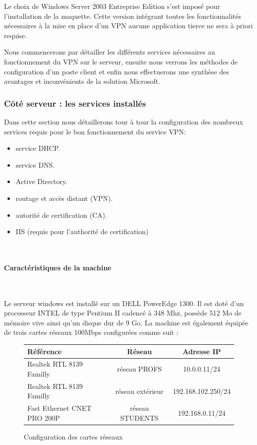 Le choix de Windows Server 2003 Entreprise Edition s'est imposé pour l'installation de la maquette. Cette version intégrant toutes les fonctionnalités nécessaires à la mise en place d'un VPN aucune application tierce ne sera à priori requise.

Nous commencerons par détailler les différents services nécessaires au fonctionnement du VPN sur le serveur, ensuite nous verrons les méthodes de configuration d'un poste client et enfin nous effectuerons une synthèse des avantages et inconvénients de la solution Microsoft.

\subsubsection{Côté serveur : les services installés}

Dans cette section nous détaillerons tour à tour la configuration des nombreux services requis pour le bon fonctionnement du service VPN:
\begin{itemize}
	\item service DHCP.
	\item service DNS.
	\item Active Directory.
	\item routage et accès distant (VPN).
	\item autorité de certification (CA).
	\item IIS (requis pour l'authorité de certification)
\end{itemize}
~



\paragraph{Caractéristiques de la machine}
~

Le serveur windows est installé sur un DELL PowerEdge 1300. Il est doté d'un processeur INTEL de type Pentium II cadencé à 348 Mhz, possède 512 Mo de mémoire vive ainsi qu'un disque dur de 9 Go. La machine est également équipée de trois cartes réseaux 100Mbps configurées comme suit :

\begin{figure}[H]
	\begin{center}
		\begin{tabular}{l|c|c}
		Référence & Réseau & Adresse IP \\
		\hline
		Realtek RTL 8139 Familly & réseau PROFS & 10.0.0.11/24 \\
		Realtek RTL 8139 Familly & réseau extérieur & 192.168.102.250/24 \\
		Fast Ethernet CNET PRO 200P & réseau STUDENTS & 192.168.0.11/24 \\
	\end{tabular}
	\end{center}
	\caption{Configuration des cartes réseaux}
	\label{IP_carte_reseau}
\end{figure}


